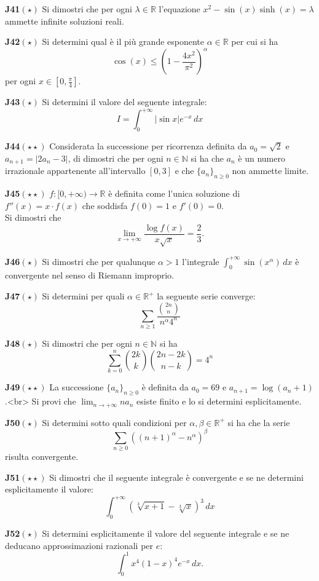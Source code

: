 \documentclass[a4paper,twoside]{article}
\theoremstyle{definition}
\numberwithin{theorem}{section}
\begin{document}
\textbf{J41}$(\star)$ Si dimostri che per ogni $\lambda\in\mathbb{R}$ l'equazione $x^2-\sin(x)\sinh(x)=\lambda$ ammette infinite soluzioni reali.

\textbf{J42}$(\star)$ Si determini qual è il più grande esponente $\alpha\in\mathbb{R}$ per cui si ha
$$ \cos(x)\leq\left(1-\frac{4x^2}{\pi^2}\right)^\alpha $$
per ogni $x\in\left[0,\frac{\pi}{4}\right]$.

\textbf{J43}$(\star)$ Si determini il valore del seguente integrale:
$$ I=\int_{0}^{+\infty}\left|\sin x\right| e^{-x}\,dx $$

\textbf{J44}$(\star\star)$ Considerata la successione per ricorrenza definita da $a_0=\sqrt{2}$ e $a_{n+1}=|2a_n-3|$, di dimostri che per ogni $n\in\mathbb{N}$ si ha che $a_n$ è un numero irrazionale appartenente all'intervallo $[0,3]$ e che $\{a_n\}_{n\geq 0}$ non ammette limite.

\textbf{J45}$(\star\star)$ $f:[0,+\infty)\to\mathbb{R}$ è definita come l'unica soluzione di $f''(x)=x\cdot f(x)$ che soddisfa $f(0)=1$ e $f'(0)=0$.\\ Si dimostri che 
$$ \lim_{x\to +\infty}\frac{\log f(x)}{x\sqrt{x}} = \frac{2}{3}.$$

\textbf{J46}$(\star)$ Si dimostri che per qualunque $\alpha > 1$ l'integrale $\int_{0}^{+\infty}\sin(x^\alpha)\,dx $ è convergente nel senso di Riemann improprio.

\textbf{J47}$(\star)$ Si determini per quali $\alpha\in\mathbb{R}^+$ la seguente serie converge:
$$ \sum_{n\geq 1}\frac{\binom{2n}{n}}{n^\alpha 4^n} $$

\textbf{J48}$(\star)$ Si dimostri che per ogni $n\in\mathbb{N}$ si ha
$$ \sum_{k=0}^{n}\binom{2k}{k}\binom{2n-2k}{n-k} = 4^n $$

\textbf{J49}$(\star\star)$ La successione $\{a_n\}_{n\geq 0}$ è definita da $a_0=69$ e $a_{n+1}=\log(a_n+1)$.<br> Si provi che $\lim_{n\to +\infty} na_n$ esiste finito e lo si determini esplicitamente. 

\textbf{J50}$(\star)$ Si determini sotto quali condizioni per $\alpha,\beta\in\mathbb{R}^+$ si ha che la serie
$$ \sum_{n\geq 0}\left((n+1)^\alpha-n^\alpha\right)^\beta $$
risulta convergente.

\textbf{J51}$(\star\star)$ Si dimostri che il seguente integrale è convergente e se ne determini esplicitamente il valore:
$$ \int_{0}^{+\infty}\left(\sqrt[3]{x+1}-\sqrt[3]{x}\right)^3\,dx $$

\textbf{J52}$(\star)$ Si determini esplicitamente il valore del seguente integrale e se ne deducano approssimazioni razionali per $e$: $$\int_{0}^{1}x^4(1-x)^4 e^{-x}\,dx. $$
\end{document}
